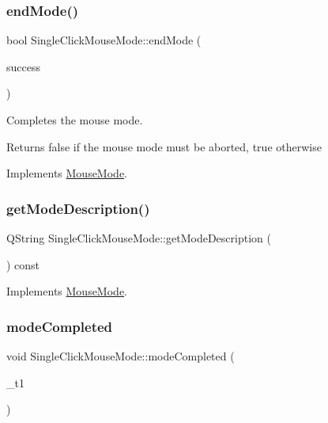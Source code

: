 \subsubsection{\texorpdfstring{endMode()}{endMode()}}
{\footnotesize\ttfamily bool Single\+Click\+Mouse\+Mode\+::end\+Mode (\begin{DoxyParamCaption}\item[{bool}]{success }\end{DoxyParamCaption})\hspace{0.3cm}{\ttfamily [virtual]}}



Completes the mouse mode. 

\begin{DoxyReturn}{Returns}
false if the mouse mode must be aborted, true otherwise 
\end{DoxyReturn}


Implements \mbox{\hyperlink{class_mouse_mode_ad88ebf649b48364a343c86c14513039e}{Mouse\+Mode}}.

\mbox{\label{class_single_click_mouse_mode_a135c1060f9c167ea441c9b257bd1fbc3}} 
\subsubsection{\texorpdfstring{getModeDescription()}{getModeDescription()}}
{\footnotesize\ttfamily Q\+String Single\+Click\+Mouse\+Mode\+::get\+Mode\+Description (\begin{DoxyParamCaption}{ }\end{DoxyParamCaption}) const\hspace{0.3cm}{\ttfamily [virtual]}}



Implements \mbox{\hyperlink{class_mouse_mode_aa442d3058243efe81e8052a137c2072e}{Mouse\+Mode}}.

\mbox{\label{class_single_click_mouse_mode_a0ff38b4cf1feb6d2d783eef5f0e68097}} 
\subsubsection{\texorpdfstring{modeCompleted}{modeCompleted}}
{\footnotesize\ttfamily void Single\+Click\+Mouse\+Mode\+::mode\+Completed (\begin{DoxyParamCaption}\item[{Q\+PointF}]{\+\_\+t1 }\end{DoxyParamCaption})\hspace{0.3cm}{\ttfamily [signal]}}

